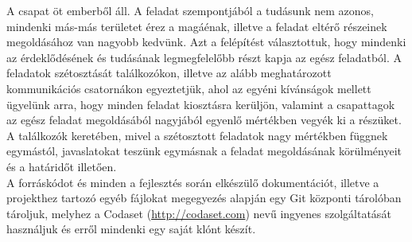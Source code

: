 A csapat öt emberből áll. A feladat szempontjából a tudásunk nem azonos, mindenki más-más területet érez a magáénak, illetve a feladat eltérő részeinek megoldásához van nagyobb kedvünk. Azt a felépítést választottuk, hogy mindenki az érdeklődésének és tudásának legmegfelelőbb részt kapja az egész feladatból. A feladatok szétosztását találkozókon, illetve az alább meghatározott kommunikációs csatornákon egyeztetjük, ahol az egyéni kívánságok mellett ügyelünk arra, hogy minden feladat kiosztásra kerüljön, valamint a csapattagok az egész feladat megoldásából nagyjából egyenlő mértékben vegyék ki a részüket. A találkozók keretében, mivel a szétosztott feladatok nagy mértékben függnek egymástól, javaslatokat teszünk egymásnak a feladat megoldásának körülményeit és a határidőt illetően.\\

A forráskódot és minden a fejlesztés során elkészülő dokumentációt, illetve a projekthez tartozó egyéb fájlokat megegyezés alapján egy Git központi tárolóban tároljuk, melyhez a Codaset (\url{http://codaset.com}) nevű ingyenes szolgáltatását használjuk és erről mindenki egy saját klónt készít.\\

